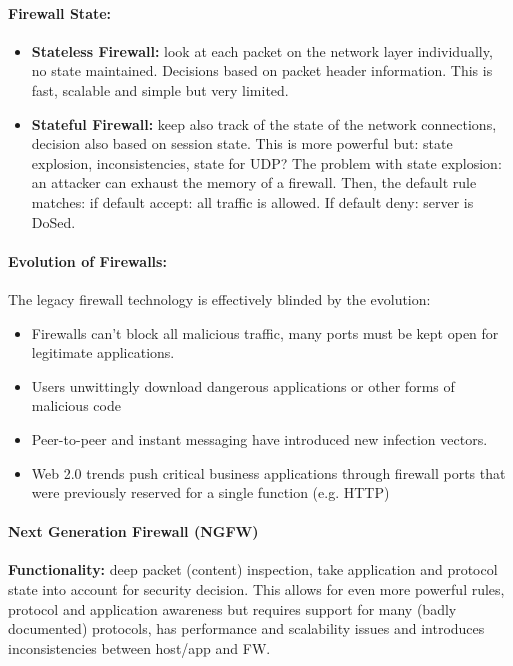\paragraph{Firewall State:}
\begin{itemize}
	\item \textbf{Stateless Firewall:} look at each packet on the network layer individually, no state maintained. Decisions based on packet header information. This is fast, scalable and simple but very limited.
	\item \textbf{Stateful Firewall:} keep also track of the state of the network connections, decision also based on session state. This is more powerful but: state explosion, inconsistencies, state for UDP? The problem with state explosion: an attacker can exhaust the memory of a firewall. Then, the default rule matches: if default accept: all traffic is allowed. If default deny: server is DoSed.
\end{itemize}

\paragraph{Evolution of Firewalls:} The legacy firewall technology is effectively blinded by the evolution:
\begin{itemize}
    \item Firewalls can't block all malicious traffic, many ports must be kept open for legitimate applications.
    \item Users unwittingly download dangerous applications or other forms of malicious code
    \item Peer-to-peer and instant messaging have introduced new infection vectors.
    \item Web 2.0 trends push critical business applications through firewall ports that were previously reserved for a single function (e.g. HTTP)
\end{itemize}

\paragraph{Next Generation Firewall (NGFW)}

\textbf{Functionality:} deep packet (content) inspection, take application and protocol state into
account for security decision. This allows for even more powerful rules, protocol and application awareness but requires support for many (badly documented) protocols, has performance and scalability issues and introduces inconsistencies between host/app and FW.


